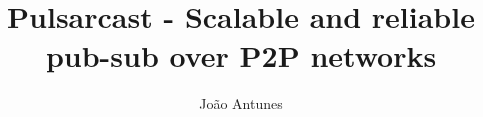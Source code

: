 \documentclass[sigplan, screen, nonacm]{acmart}
\begin{document}
\title[Pulsarcast]{Pulsarcast - Scalable and reliable pub-sub over P2P networks}


\renewcommand{\shorttitle}{Pulsarcast}


\author{João Antunes}


\maketitle










\end{document}

